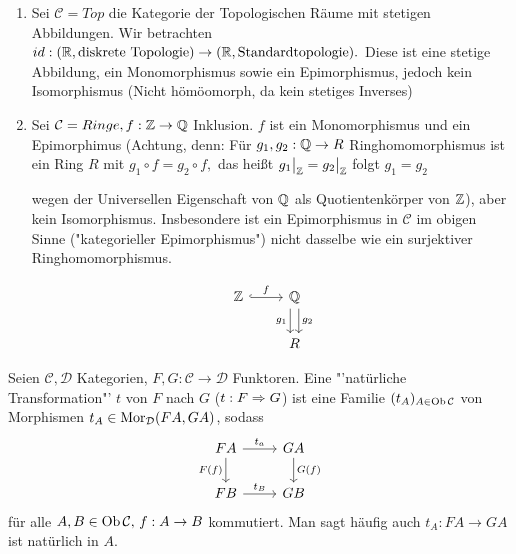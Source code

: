 \begin{bsp}
	\begin{enumerate} [label= \alph*)]
		\item  Sei $\mathcal{C} = Top  $ die Kategorie der Topologischen Räume mit stetigen Abbildungen. Wir betrachten $id: (\mathbb{R}, \text{diskrete Topologie}) \to (\mathbb{R}, \text{Standardtopologie}).$ Diese ist eine stetige Abbildung, ein Monomorphismus sowie ein Epimorphismus, jedoch kein Isomorphismus (Nicht hömöomorph, da kein stetiges Inverses)
		\item Sei $\mathcal{C} = Ringe, f:\mathbb{Z} \to \mathbb{Q} $ Inklusion. $f$ ist ein  Monomorphismus und ein Epimorphimus (Achtung, denn: Für $g_1,g_2: \mathbb{Q} \to R$ Ringhomomorphismus ist ein Ring $R$ mit $g_1 \circ f = g_2 \circ f, $ das heißt $ g_1\big|_{\mathbb{Z}} = g_2\big|_{\mathbb{Z}} $ folgt $ g_1 = g_2 $
		 \begin{minipage}[t]{0.7\textwidth}
		 	wegen der Universellen Eigenschaft von $\mathbb{Q}$ als
		 	Quotientenkörper von $\mathbb{Z}$), aber kein Isomorphismus. 
		Insbesondere ist ein Epimorphismus in $\mathcal{C} $ im obigen Sinne  ("kategorieller Epimorphismus") nicht dasselbe wie ein surjektiver Ringhomomorphismus.
		\end{minipage}
		\begin{minipage}[t]{0.3\textwidth} 
			$$\begin{tikzcd}
			\Z \arrow[hook]{r}{f} & \Q \arrow[xshift = 0.7ex]{d}{g_2} \arrow[xshift = -0.7ex, swap]{d}{g_1}\\ & R
			\end{tikzcd}$$
		\end{minipage}
	\end{enumerate}
\end{bsp}
\begin{df}
	Seien $\mathcal{C}, \mathcal{D}$ Kategorien, $F,G:\mathcal{C} \to \mathcal{D}$ Funktoren. Eine "'natürliche Transformation"' $t$ von $F$ nach $G$ ($t: F \Rightarrow G$) ist eine Familie $(t_A)_{A\in \text{Ob}\,\mathcal{C}}$ von Morphismen $t_A\in \text{Mor}_{\mathcal{D}}(FA, GA)$, sodass 
	$$\begin{tikzcd}
	FA \arrow{r}{t_a} \arrow[swap]{d}{F(f)}& GA\arrow{d}{G(f)}\\
	FB \arrow{r}{t_B} & GB
	\end{tikzcd}$$
	für alle $A,B \in \text{Ob}\,\mathcal{C}, \, f:A\to B$ kommutiert. Man sagt häufig auch $t_A: FA \to GA$ ist natürlich in $A$.
\end{df}
